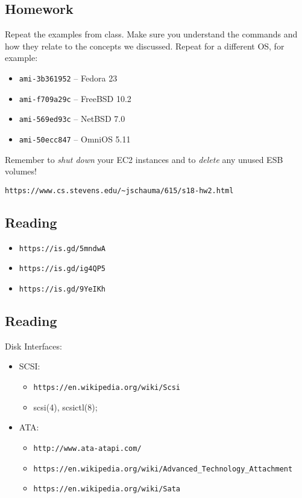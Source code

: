 \documentclass[xga]{xdvislides}
\begin{document}
\subsection{Homework}
Repeat the examples from class.  Make sure you understand the commands and
how they relate to the concepts we discussed.  Repeat for a different OS,
for example: \\

\begin{itemize}
	\item {\tt ami-3b361952} -- Fedora 23
	\item {\tt ami-f709a29c} -- FreeBSD 10.2
	\item {\tt ami-569ed93c} -- NetBSD 7.0
	\item {\tt ami-50ecc847} -- OmniOS 5.11
\end{itemize}

\vspace{.5in}
Remember to {\em shut down} your EC2 instances and to {\em delete} any unused ESB
volumes!

\vspace{.5in}
{\tt https://www.cs.stevens.edu/\~{}jschauma/615/s18-hw2.html}


\subsection{Reading}
\begin{itemize}
	\item \verb+https://is.gd/5mndwA+
	\item \verb+https://is.gd/ig4QP5+
	\item \verb+https://is.gd/9YeIKh+
\end{itemize}

\subsection{Reading}
Disk Interfaces:
\begin{itemize}
	\item SCSI:
		\begin{itemize}
			\item \verb+https://en.wikipedia.org/wiki/Scsi+
			\item scsi(4), scsictl(8);
		\end{itemize}
	\item ATA:
		\begin{itemize}
			\item \verb+http://www.ata-atapi.com/+
			\item \verb+https://en.wikipedia.org/wiki/Advanced_Technology_Attachment+
			\item \verb+https://en.wikipedia.org/wiki/Sata+
		\end{itemize}
\end{itemize}
\end{document}

